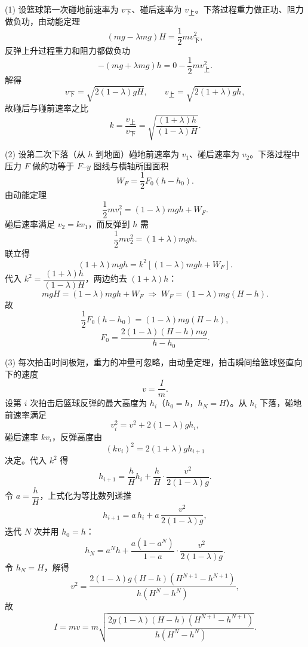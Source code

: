 \begin{answer}
(1) 设篮球第一次碰地前速率为 $v_{\text{下}}$、碰后速率为 $v_{\text{上}}$。下落过程重力做正功、阻力做负功，由动能定理
\[
  (mg-\lambda mg)H=\frac{1}{2}mv_{\text{下}}^{2},
\]
反弹上升过程重力和阻力都做负功
\[
  -(mg+\lambda mg)h=0-\frac{1}{2}mv_{\text{上}}^{2}.
\]
解得
\[
  v_{\text{下}}=\sqrt{2(1-\lambda)gH},\qquad
  v_{\text{上}}=\sqrt{2(1+\lambda)gh},
\]
故碰后与碰前速率之比
\[
  k=\frac{v_{\text{上}}}{v_{\text{下}}}
  =\sqrt{\frac{(1+\lambda)h}{(1-\lambda)H}} .
\]

(2) 设第二次下落（从 $h$ 到地面）碰地前速率为 $v_{1}$、碰后速率为 $v_{2}$。下落过程中压力 $F$ 做的功等于 $F$--$y$ 图线与横轴所围面积
\[
  W_{F}=\frac{1}{2}F_{0}(h-h_{0}).
\]
由动能定理
\[
  \frac{1}{2}mv_{1}^{2}=(1-\lambda)mgh+W_{F}.
\]
碰后速率满足 $v_{2}=kv_{1}$，而反弹到 $h$ 需
\[
  \frac{1}{2}mv_{2}^{2}=(1+\lambda)mgh .
\]
联立得
\[
  (1+\lambda)mgh=k^{2}\left[(1-\lambda)mgh+W_{F}\right].
\]
代入 $k^{2}=\dfrac{(1+\lambda)h}{(1-\lambda)H}$，两边约去 $(1+\lambda)h$：
\[
  mgH=(1-\lambda)mgh+W_{F}
  \;\Longrightarrow\;
  W_{F}=(1-\lambda)mg(H-h).
\]
故
\[
  \frac{1}{2}F_{0}(h-h_{0})=(1-\lambda)mg(H-h),
\]
\[
  F_{0}=\frac{2(1-\lambda)(H-h)mg}{h-h_{0}} .
\]

(3) 每次拍击时间极短，重力的冲量可忽略，由动量定理，拍击瞬间给篮球竖直向下的速度
\[
  v=\frac{I}{m}.
\]
设第 $i$ 次拍击后篮球反弹的最大高度为 $h_{i}$（$h_{0}=h$，$h_{N}=H$）。从 $h_{i}$ 下落，碰地前速率满足
\[
  v_{i}^{2}=v^{2}+2(1-\lambda)gh_{i},
\]
碰后速率 $kv_{i}$，反弹高度由
\[
  (kv_{i})^{2}=2(1+\lambda)gh_{i+1}
\]
决定。代入 $k^{2}$ 得
\[
  h_{i+1}=\frac{h}{H}h_{i}+\frac{h}{H}\cdot\frac{v^{2}}{2(1-\lambda)g}.
\]
令 $a=\dfrac{h}{H}$，上式化为等比数列递推
\[
  h_{i+1}=a\,h_{i}+a\,\frac{v^{2}}{2(1-\lambda)g},
\]
迭代 $N$ 次并用 $h_{0}=h$：
\[
  h_{N}=a^{N}h+\frac{a(1-a^{N})}{1-a}\cdot\frac{v^{2}}{2(1-\lambda)g}.
\]
令 $h_{N}=H$，解得
\[
  v^{2}=\frac{2(1-\lambda)g(H-h)(H^{N+1}-h^{N+1})}{h(H^{N}-h^{N})},
\]
故
\[
  I=mv
  =m\sqrt{\frac{2g(1-\lambda)(H-h)(H^{N+1}-h^{N+1})}{h(H^{N}-h^{N})}} .
\]
\end{answer}


